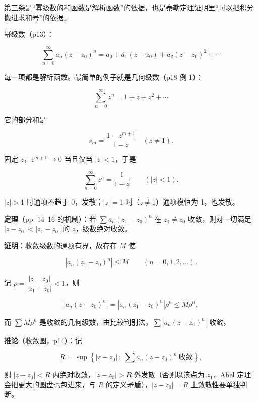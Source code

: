 \documentclass[11pt]{ctexart}
\let\origsubhdr\subhdr
\renewcommand{\subhdr}[1]{\par\needspace{4\baselineskip}\origsubhdr{#1}}
\let\orighdr\hdr
\renewcommand{\hdr}[2]{\par\needspace{9\baselineskip}\orighdr{#1}{#2}}
\begin{document}
第三条是“幂级数的和函数是解析函数”的依据，也是泰勒定理证明里“可以把积分搬进求和号”的依据。




幂级数（p13）：

\[ \sum_{n=0}^{\infty}a_n(z-z_0)^n=a_0+a_1(z-z_0)+a_2(z-z_0)^2+\cdots \]

每一项都是解析函数。最简单的例子就是几何级数（p18 例 1）：

\[ \sum_{n=0}^{\infty}z^n=1+z+z^2+\cdots \]

它的部分和是

\[ s_m=\frac{1-z^{m+1}}{1-z}\quad(z\ne1) . \]

固定 $z$，$z^{m+1}\to0$ 当且仅当 $|z|<1$，于是

\[ \sum_{n=0}^{\infty}z^n=\frac{1}{1-z}\qquad(|z|<1) . \]

$|z|>1$ 时通项不趋于 0，发散；$|z|=1$ 时（$z\ne1$）通项模恒为 1，也发散。


\textbf{定理}（pp. 14--16 的机制）：若 $\sum a_n(z_1-z_0)^n$ 在 $z_1\ne z_0$ 收敛，则对一切满足 $|z-z_0|<|z_1-z_0|$ 的 $z$，级数绝对收敛。

\textbf{证明}：收敛级数的通项有界，故存在 $M$ 使

\[ |a_n(z_1-z_0)^n|\le M\qquad(n=0,1,2,\dots) . \]

记 $\rho=\dfrac{|z-z_0|}{|z_1-z_0|}<1$，则

\[ |a_n(z-z_0)^n|=\left|a_n(z_1-z_0)^n\right|\rho^n\le M\rho^n , \]

而 $\sum M\rho^n$ 是收敛的几何级数，由比较判别法，$\sum|a_n(z-z_0)^n|$ 收敛。


\textbf{推论}（收敛圆，p14）：记

\[ R=\sup\left\{|z-z_0|\ :\ \sum a_n(z-z_0)^n\ \text{收敛}\right\} , \]

则 $|z-z_0|<R$ 内绝对收敛，$|z-z_0|>R$ 外发散（否则以该点为 $z_1$，Abel 定理会把更大的圆盘也包进来，与 $R$ 的定义矛盾），$|z-z_0|=R$ 上敛散性要单独判断。
\end{document}
